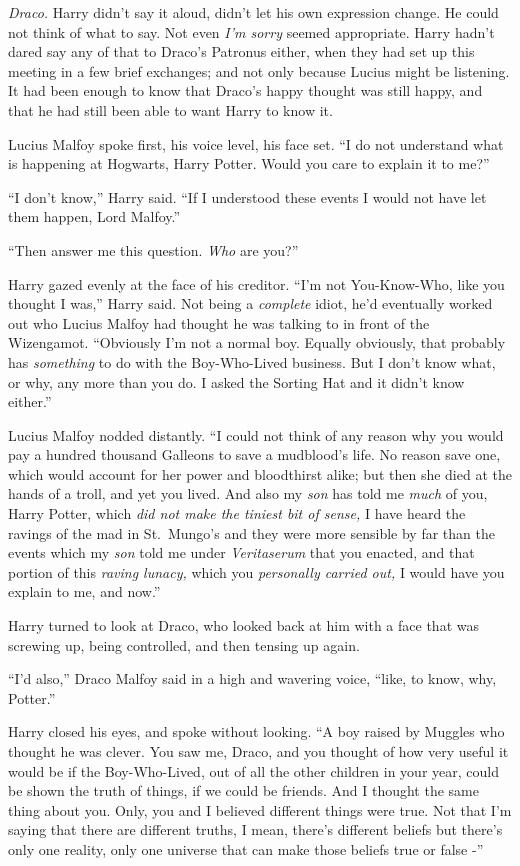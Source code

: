 \emph{Draco.} Harry didn't say it aloud, didn't let his own expression
change. He could not think of what to say. Not even \emph{I'm sorry}
seemed appropriate. Harry hadn't dared say any of that to Draco's
Patronus either, when they had set up this meeting in a few brief
exchanges; and not only because Lucius might be listening. It had been
enough to know that Draco's happy thought was still happy, and that he
had still been able to want Harry to know it.

Lucius Malfoy spoke first, his voice level, his face set. ``I do not
understand what is happening at Hogwarts, Harry Potter. Would you care
to explain it to me?''

``I don't know,'' Harry said. ``If I understood these events I would not
have let them happen, Lord Malfoy.''

``Then answer me this question. \emph{Who} are you?''

Harry gazed evenly at the face of his creditor. ``I'm not You-Know-Who,
like you thought I was,'' Harry said. Not being a \emph{complete} idiot,
he'd eventually worked out who Lucius Malfoy had thought he was talking
to in front of the Wizengamot. ``Obviously I'm not a normal boy. Equally
obviously, that probably has \emph{something} to do with the
Boy-Who-Lived business. But I don't know what, or why, any more than you
do. I asked the Sorting Hat and it didn't know either.''

Lucius Malfoy nodded distantly. ``I could not think of any reason why
you would pay a hundred thousand Galleons to save a mudblood's life. No
reason save one, which would account for her power and bloodthirst
alike; but then she died at the hands of a troll, and yet you lived. And
also my \emph{son} has told me \emph{much} of you, Harry Potter, which
\emph{did not make the tiniest bit of sense,} I have heard the ravings
of the mad in St.~Mungo's and they were more sensible by far than the
events which my \emph{son} told me under \emph{Veritaserum} that you
enacted, and that portion of this \emph{raving lunacy,} which you
\emph{personally carried out,} I would have you explain to me, and
now.''

Harry turned to look at Draco, who looked back at him with a face that
was screwing up, being controlled, and then tensing up again.

``I'd also,'' Draco Malfoy said in a high and wavering voice, ``like, to
know, why, Potter.''

Harry closed his eyes, and spoke without looking. ``A boy raised by
Muggles who thought he was clever. You saw me, Draco, and you thought of
how very useful it would be if the Boy-Who-Lived, out of all the other
children in your year, could be shown the truth of things, if we could
be friends. And I thought the same thing about you. Only, you and I
believed different things were true. Not that I'm saying that there are
different truths, I mean, there's different beliefs but there's only one
reality, only one universe that can make those beliefs true or false -''

